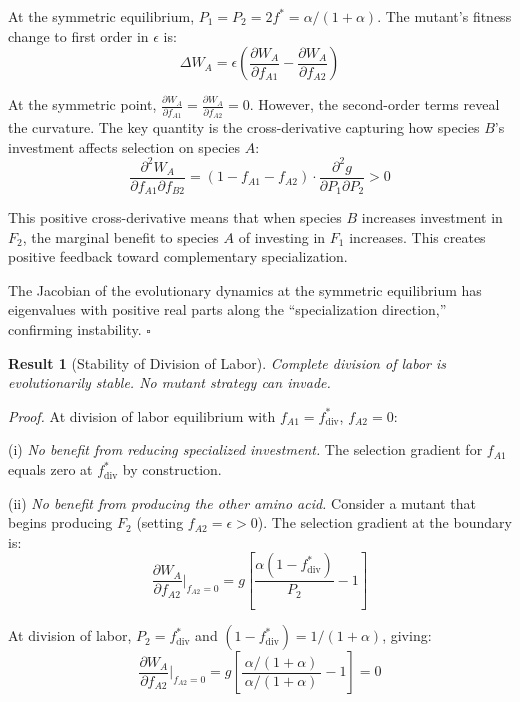 \documentclass[11pt]{article}
\newtheorem{theorem}{Result}
\newcommand{\pd}[2]{\frac{\partial #1}{\partial #2}}
\begin{document}
At the symmetric equilibrium, $P_1 = P_2 = 2f^* = \alpha/(1+\alpha)$. The mutant's fitness change to first order in $\epsilon$ is:
\begin{equation}
\Delta W_A = \epsilon \left( \pd{W_A}{f_{A1}} - \pd{W_A}{f_{A2}} \right)
\end{equation}

At the symmetric point, $\pd{W_A}{f_{A1}} = \pd{W_A}{f_{A2}} = 0$. However, the second-order terms reveal the curvature. The key quantity is the cross-derivative capturing how species $B$'s investment affects selection on species $A$:
\begin{equation}
\frac{\partial^2 W_A}{\partial f_{A1} \partial f_{B2}} = (1 - f_{A1} - f_{A2}) \cdot \frac{\partial^2 g}{\partial P_1 \partial P_2} > 0
\end{equation}

This positive cross-derivative means that when species $B$ increases investment in $F_2$, the marginal benefit to species $A$ of investing in $F_1$ increases. This creates positive feedback toward complementary specialization.

The Jacobian of the evolutionary dynamics at the symmetric equilibrium has eigenvalues with positive real parts along the ``specialization direction,'' confirming instability. \hfill $\square$

\begin{theorem}[Stability of Division of Labor]
Complete division of labor is evolutionarily stable. No mutant strategy can invade.
\end{theorem}

\textit{Proof.} At division of labor equilibrium with $f_{A1} = f^*_{\text{div}}$, $f_{A2} = 0$:

(i) \textit{No benefit from reducing specialized investment.} The selection gradient for $f_{A1}$ equals zero at $f^*_{\text{div}}$ by construction.

(ii) \textit{No benefit from producing the other amino acid.} Consider a mutant that begins producing $F_2$ (setting $f_{A2} = \epsilon > 0$). The selection gradient at the boundary is:
\begin{equation}
\pd{W_A}{f_{A2}}\bigg|_{f_{A2}=0} = g \left[ \frac{\alpha(1 - f^*_{\text{div}})}{P_2} - 1 \right]
\end{equation}

At division of labor, $P_2 = f^*_{\text{div}}$ and $(1 - f^*_{\text{div}}) = 1/(1+\alpha)$, giving:
\begin{equation}
\pd{W_A}{f_{A2}}\bigg|_{f_{A2}=0} = g \left[ \frac{\alpha/(1+\alpha)}{~\alpha/(1+\alpha)~} - 1 \right] = 0
\end{equation}
\end{document}
